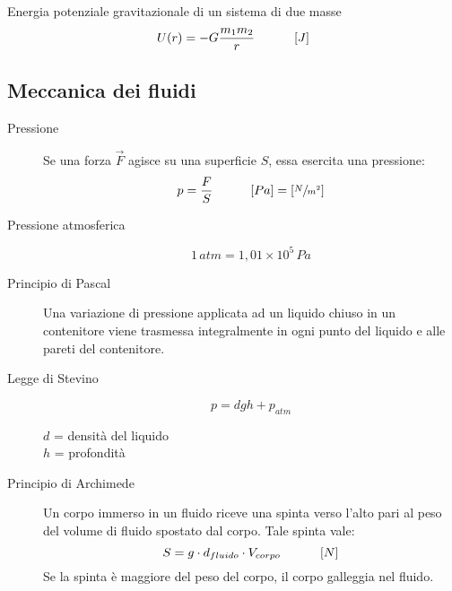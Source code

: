 \documentclass[a4paper,11pt,italian]{article}
\begin{document}
\begin{description}
\begin{soloscientifico}
  \item[Energia potenziale gravitazionale di un sistema di due masse] 
  \[ U(r) = - G \frac{m_1m_2}{r} \hspace*{3em} \left[ J \right] \]
\end{soloscientifico}   %
\end{description}


\subsection{Meccanica dei fluidi}

\begin{description}
  \item[Pressione] 
  Se una forza $ \vec{F} $ agisce su una superficie $ S $, essa esercita una pressione:
  \[ p = \frac{F}{S} \hspace*{3em} [Pa] = \left[ \sfrac{N}{m^2} \right] \]
  
  \item[Pressione atmosferica]
  \[ 1 \, atm = 1,01 \times 10^5 \, Pa \]
  
  \item[Principio di Pascal] 
  Una variazione di pressione applicata ad un liquido chiuso in un contenitore viene trasmessa integralmente in ogni punto del liquido e alle pareti del contenitore.
  
  \item[Legge di Stevino]
  \[ p = dgh + p_{atm} \]
  \begin{multicols}{2}
  $ d $ = densità del liquido\\
  $ h $ = profondità
  \end{multicols}
  
  \item[Principio di Archimede] 
  Un corpo immerso in un fluido riceve una spinta verso l'alto pari al peso del volume di fluido spostato dal corpo. Tale spinta vale:
  \[ S = g \cdot d_{fluido} \cdot V_{corpo} \hspace*{3em} \left[ N \right] \]
  Se la spinta è maggiore del peso del corpo, il corpo galleggia nel fluido.

\end{description}
\end{document}
